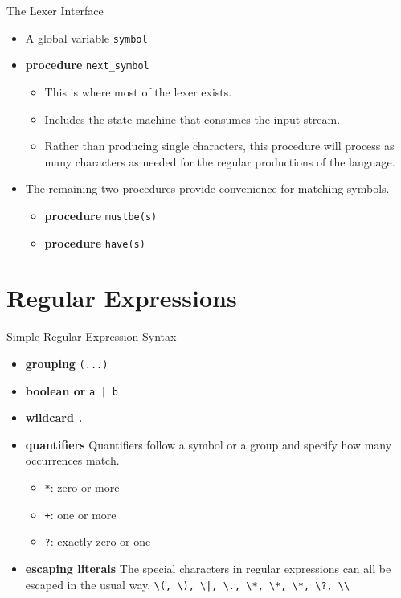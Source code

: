 \documentclass[]{beamer}
\begin{document}
\begin{frame}{The Lexer Interface}
    \begin{itemize}[<+->]
        \item A global variable \texttt{symbol}
        \item \textbf{procedure} \texttt{next\_symbol}
        \begin{itemize}
            \item This is where most of the lexer exists.
            \item Includes the state machine that consumes the input
                stream.
            \item Rather than producing single characters, this 
                procedure will process as many characters as needed
                for the regular productions of the language.
        \end{itemize}
        \item The remaining two procedures provide convenience for
            matching symbols.
            \begin{itemize}
                \item \textbf{procedure} \texttt{mustbe(s)}
                \item \textbf{procedure} \texttt{have(s)}
            \end{itemize}
    \end{itemize}
\end{frame}

\section{Regular Expressions}
\begin{frame}[fragile]{Simple Regular Expression Syntax}
    \begin{itemize}[<+->]
        \item \textbf{grouping}  \texttt{(...)}
        \item \textbf{boolean or} \texttt{a | b}
        \item \textbf{wildcard} \texttt{.}
        \item \textbf{quantifiers} Quantifiers follow a symbol or a
            group and specify how many occurrences match.
            \begin{itemize}
                \item \texttt{*}: zero or more
                \item \texttt{+}: one or more
                \item \texttt{?}: exactly zero or one
            \end{itemize}
        \item \textbf{escaping literals} The special characters in regular
            expressions can all be escaped in the usual way. 
            \newline \verb!\(, \), \|, \., \*, \*, \*, \?, \\!
    \end{itemize}
\end{frame}
\end{document}
